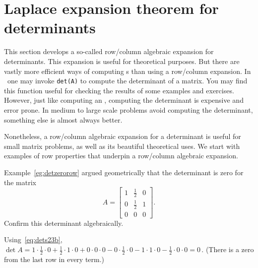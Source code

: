 

\section{Laplace expansion theorem for determinants}
\label{sec:apd}
\secttoc



This section develops a so-called row\slash column algebraic expansion for determinants. 
This expansion is useful for theoretical purposes.
But there are vastly more efficient ways of computing s than using a row\slash column expansion.  
In \script\ one may invoke \verb|det(A)| to compute the determinant of a matrix.
You may find this function useful for checking the results of some examples and exercises.
However, just like computing an , computing the determinant is expensive and error prone.  
In medium to large scale problems avoid computing the determinant, something else is almost always better.

Nonetheless, a row\slash column algebraic expansion for a determinant is useful for small matrix problems, as well as its beautiful  theoretical uses.
We start with examples of row properties that underpin a row\slash column algebraic expansion.





\begin{example} \label{eg:detzerorowii}
Example~\ref{eg:detzerorow} argued geometrically that the determinant is zero for the matrix
\begin{equation*}
A=\begin{bmatrix} 1&\frac12&0
\\0&\frac12&1 \\0&0&0 \end{bmatrix}.
\end{equation*}
Confirm this determinant algebraically.
\begin{solution} 
Using~\eqref{eq:dets23b}, \(\det A
=1\cdot\frac12\cdot0+\frac12\cdot1\cdot0+0\cdot0\cdot0
-0\cdot\frac12\cdot0-1\cdot1\cdot0-\frac12\cdot0\cdot0
=0\)\,.  (There is a zero from the last row in every term.)
\end{solution}
\end{example}


